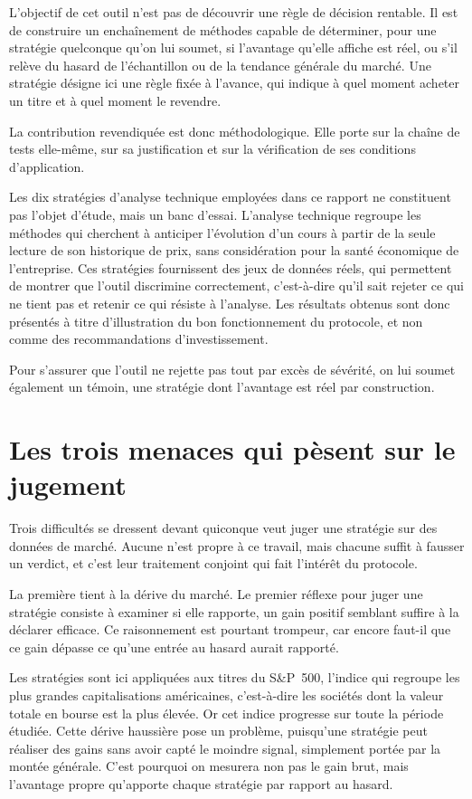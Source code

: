 L'objectif de cet outil n'est pas de découvrir une règle de décision
rentable. Il est de construire un enchaînement de méthodes capable de
déterminer, pour une stratégie quelconque qu'on lui soumet, si l'avantage
qu'elle affiche est réel, ou s'il relève du hasard de l'échantillon ou de la
tendance générale du marché. Une stratégie désigne ici une règle fixée à
l'avance, qui indique à quel moment acheter un titre et à quel moment le
revendre.

La contribution revendiquée est donc méthodologique. Elle porte sur la chaîne
de tests elle-même, sur sa justification et sur la vérification de ses
conditions d'application.

Les dix stratégies d'analyse technique employées dans ce rapport ne
constituent pas l'objet d'étude, mais un banc d'essai. L'analyse technique
regroupe les méthodes qui cherchent à anticiper l'évolution d'un cours à
partir de la seule lecture de son historique de prix, sans considération pour
la santé économique de l'entreprise. Ces stratégies fournissent des jeux de
données réels, qui permettent de montrer que l'outil discrimine correctement,
c'est-à-dire qu'il sait rejeter ce qui ne tient pas et retenir ce qui résiste
à l'analyse. Les résultats obtenus sont donc présentés à titre d'illustration
du bon fonctionnement du protocole, et non comme des recommandations
d'investissement.

Pour s'assurer que l'outil ne rejette pas tout par excès de sévérité, on lui
soumet également un témoin, une stratégie dont l'avantage est réel par
construction.

\section*{Les trois menaces qui pèsent sur le jugement}
\label{sec:menaces}

Trois difficultés se dressent devant quiconque veut juger une stratégie sur
des données de marché. Aucune n'est propre à ce travail, mais chacune suffit
à fausser un verdict, et c'est leur traitement conjoint qui fait l'intérêt du
protocole.

La première tient à la dérive du marché. Le premier réflexe pour juger une
stratégie consiste à examiner si elle rapporte, un gain positif semblant
suffire à la déclarer efficace. Ce raisonnement est pourtant trompeur, car
encore faut-il que ce gain dépasse ce qu'une entrée au hasard aurait
rapporté.

Les stratégies sont ici appliquées aux titres du S\&P~500, l'indice qui
regroupe les plus grandes capitalisations américaines, c'est-à-dire les
sociétés dont la valeur totale en bourse est la plus élevée. Or cet indice
progresse sur toute la période étudiée. Cette dérive haussière pose un
problème, puisqu'une stratégie peut réaliser des gains sans avoir capté le
moindre signal, simplement portée par la montée générale. C'est pourquoi on
mesurera non pas le gain brut, mais l'avantage propre qu'apporte chaque
stratégie par rapport au hasard.

